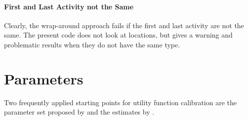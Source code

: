 \paragraph*{First and Last Activity not the Same}

Clearly, the wrap-around approach fails if the first and last activity are not the same.  The present code does not look at locations, but gives a warning and problematic results when they do not have the same type.

\section{Parameters}


Two frequently applied starting points for utility function calibration are the parameter set proposed by \citet[][]{CharyparNagel2005ga4acts} and the estimates by \citet[][]{Kickhoefer_MastersThesis_2009}.

